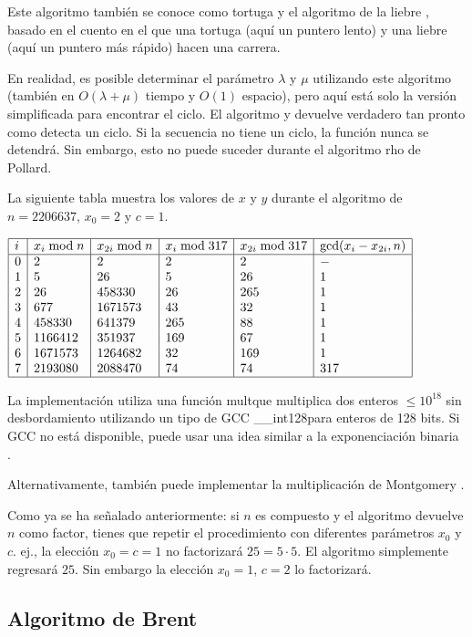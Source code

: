 Este algoritmo también se conoce como tortuga y el algoritmo de la liebre , basado en el cuento en el que una tortuga (aquí un puntero lento) y una liebre (aquí un puntero más rápido) hacen una carrera.

En realidad, es posible determinar el parámetro $\lambda$ y $\mu$ utilizando este algoritmo (también 
en $O(\lambda + \mu)$ tiempo y $O(1)$ espacio), pero aquí está solo la versión simplificada para 
encontrar el ciclo. El algoritmo y devuelve verdadero tan pronto como detecta un ciclo. Si la 
secuencia no tiene un ciclo, la función nunca se detendrá. Sin embargo, esto no puede suceder durante 
el algoritmo rho de Pollard.

La siguiente tabla muestra los valores de $x$ y $y$ durante el algoritmo de $n = 2206637$, $x_0 = 2$ y $c = 1$.

$ \begin{array}{|l|l|l|l|l|l|} \hline i & x_i \bmod n & x_{2i} \bmod n & x_i \bmod 317 & x_{2i} \bmod 317 & \gcd(x_i - x_{2i}, n) \\ \hline 0 & 2 & 2 & 2 & 2 & - \\ 1 & 5 & 26 & 5 & 26 & 1 \\ 2 & 26 & 458330 & 26 & 265 & 1 \\ 3 & 677 & 1671573 & 43 & 32 & 1 \\ 4 & 458330 & 641379 & 265 & 88 & 1 \\ 5 & 1166412 & 351937 & 169 & 67 & 1 \\ 6 & 1671573 & 1264682 & 32 & 169 & 1 \\ 7 & 2193080 & 2088470 & 74 & 74 & 317 \\ \hline \end{array} $

La implementación utiliza una función multque multiplica dos enteros $\le 10^{18}$ sin desbordamiento utilizando un tipo de GCC \_\_int128para enteros de 128 bits. Si GCC no está disponible, puede usar una idea similar a la exponenciación binaria .

Alternativamente, también puede implementar la multiplicación de Montgomery .

Como ya se ha señalado anteriormente: si $n$ es compuesto y el algoritmo devuelve $n$ como factor, tienes que repetir el procedimiento con diferentes parámetros $x_0$ y $c$. ej., la elección $x_0 = c = 1$ no factorizará $25 = 5 \cdot 5$. El algoritmo simplemente regresará $25$. Sin embargo la elección $x_0 = 1$, $c = 2$ lo factorizará.

\subsection{Algoritmo de Brent}

